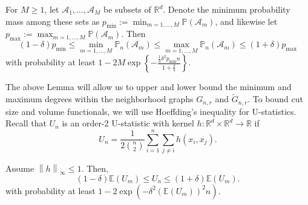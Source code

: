 \documentclass[11pt,twoside]{article}
\newcommand{\Reals}{\mathbb{R}}
\newcommand{\Rd}{\Reals^d}
\newcommand{\norm}[1]{\left\lVert#1\right\rVert}
\newcommand{\1}{\mathbbm{1}}
\newcommand{\Pbb}{\mathbb{P}}
\begin{document}
\begin{lemma}
	\label{lem:bernstein_union}
	For $M \geq 1$, let $\mathcal{A}_1,\ldots,\mathcal{A}_M$ be subsets of $\Reals^d$. Denote the minimum probability mass among these sets as $p_{\min} := \min_{m = 1,\ldots,M} \Pbb(\mathcal{A}_m)$, and likewise let $p_{\max} := \max_{m = 1,\ldots,M} \Pbb(\mathcal{A}_m)$. Then
	\begin{equation*}
	(1 - \delta)p_{\min} \leq \min_{m = 1,\ldots,M} \Pbb_n(\mathcal{A}_m) \leq \max_{m = 1,\ldots,M} \Pbb_n(\mathcal{A}_m) \leq (1 + \delta)p_{\max}
	\end{equation*}
	with probability at least $1 - 2 M \exp\left\{-\frac{\frac{1}{3}\delta^2p_{\min}n}{1 + \frac{\delta}{3}}\right\}$.  
\end{lemma}
The above Lemma will allow us to upper and lower bound the minimum and maximum degrees within the neighborhood graphs $G_{n,r}$ and $\widetilde{G}_{n,r}$. To bound cut size and volume functionals, we will use Hoeffding's inequality for U-statistics. Recall that $U_n$ is an order-2 U-statistic with kernel $h: \Rd \times \Rd \to \Reals$ if 
\begin{equation*}
U_n = \frac{1}{2{n \choose 2}}\sum_{i = 1}^{n} \sum_{j \neq i} h(x_i,x_j).
\end{equation*}
\begin{lemma}
	\label{lem:hoeffding}
	Assume $\norm{h}_{\infty} \leq 1$. Then,
	\begin{equation*}
	(1 - \delta) \mathbb{E}(U_m) \leq U_n \leq (1 + \delta) \mathbb{E}(U_m).
	\end{equation*}
	with probability at least $1 - 2 \exp\left(-\delta^2 (\mathbb{E}(U_m))^2 n\right)$.
\end{lemma}
\end{document}

